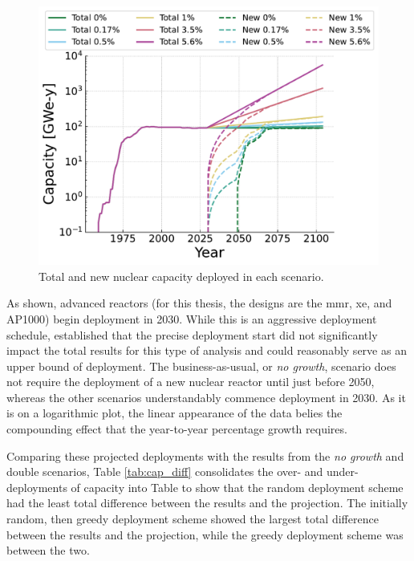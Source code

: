 \begin{figure}[H]
    \centering
    \includegraphics[scale=0.7]{images/results/deployment_calcs/total_new_capacity_scenarios.pdf}
    \caption{Total and new nuclear capacity deployed in each scenario.}
    \label{fig:dep_goals}
\end{figure}

As shown, advanced reactors (for this thesis, the designs are the \gls{mmr},
\gls{xe}, and AP1000) begin deployment in 2030. While this is an aggressive deployment schedule, \cite{bachmann_thesis_2023} established that the precise deployment start did not significantly impact the total results for this type of analysis and could reasonably serve as an upper bound of deployment. The business-as-usual, or \textit{no growth}, scenario does not require the deployment of a new nuclear reactor until just before 2050, whereas the other scenarios understandably commence deployment in 2030. As it is on a logarithmic plot, the linear appearance of the data belies the compounding effect that the year-to-year percentage growth requires.

Comparing these projected deployments with the results from the \textit{no growth} and double scenarios, Table \ref{tab:cap_diff} consolidates the over- and under- deployments of capacity into Table to show that the random deployment scheme had the least total difference between the results and the projection. The initially random, then greedy deployment scheme showed the largest total difference between the results and the projection, while the greedy deployment scheme was between the two.

